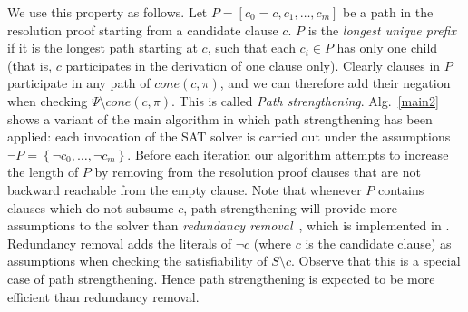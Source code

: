 \documentclass[twoside,11pt]{article}
\newcommand\muser{\tool{MUSer2}\xspace}
\renewcommand\Pr{\pi}
\begin{document}
We use this property as follows. Let $P=\left[c_0=c,c_1,\ldots,c_m\right]$ be
a path in the resolution proof starting from a candidate clause $c$.  $P$ is
the \emph{longest unique prefix} if it is the longest path starting at $c$,
such that each $c_i \in P$ has only one child (that is, $c$ participates in
the derivation of one clause only). Clearly clauses in $P$ participate in any
path of $cone(c,\Pr)$, and we can therefore add their negation when checking
$\Psi\setminus cone(c,\Pr)$. This is called \emph{Path strengthening}.
Alg.~\ref{main2} shows a variant of the main algorithm in which path
strengthening has been applied: each invocation of the SAT solver is carried
out under the assumptions $\lnot P=\left\{\lnot c_0,\ldots,\lnot
c_m\right\}$. Before each iteration our algorithm attempts to increase the length of $P$
by removing from the resolution proof clauses that are not backward
reachable from the empty clause. Note that whenever $P$ contains clauses
which do not subsume $c$, path strengthening will provide more assumptions to
the solver than \emph{redundancy
removal}~\cite{DBLP:conf/sat/MaarenW08,DBLP:journals/aicom/BelovLM12}, which
is implemented in \muser. Redundancy removal adds the
literals of $\lnot c$ (where $c$ is the candidate clause) as assumptions when
checking the satisfiability of $S \setminus c$. Observe that this is a
special case of path strengthening. Hence path strengthening is expected to
be more efficient than redundancy removal.


\end{document}
